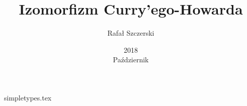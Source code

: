 \documentclass[a4paper,oneside,reqno,10pt]{article}
\title{Izomorfizm Curry'ego-Howarda}
\date{2018\\ Październik}
\author{Rafał Szczerski}
\begin{document}
\maketitle
{simpletypes.tex}
% 
% 
\end{document}

